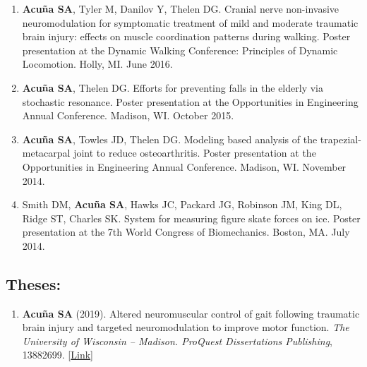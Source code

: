 \documentclass[letterpaper, 10pt]{article}
\begin{document}
\begin{enumerate}
    \item \textbf{Acuña SA}, Tyler M, Danilov Y, Thelen DG. Cranial nerve non-invasive neuromodulation for symptomatic treatment of mild and moderate traumatic brain injury: effects on muscle coordination patterns during walking. Poster presentation at the Dynamic Walking Conference: Principles of Dynamic Locomotion. Holly, MI. June 2016.
    \item \textbf{Acuña SA}, Thelen DG. Efforts for preventing falls in the elderly via stochastic resonance. Poster presentation at the Opportunities in Engineering Annual Conference. Madison, WI. October 2015.
    \item \textbf{Acuña SA}, Towles JD, Thelen DG. Modeling based analysis of the trapezial-metacarpal joint to reduce osteoarthritis. Poster presentation at the Opportunities in Engineering Annual Conference. Madison, WI. November 2014.
    \item Smith DM, \textbf{Acuña SA}, Hawks JC, Packard JG, Robinson JM, King DL, Ridge ST, Charles SK. System for measuring ﬁgure skate forces on ice. Poster presentation at the 7th World Congress of Biomechanics. Boston, MA. July 2014.
    
\end{enumerate}



\subsection{Theses:}
\begin{enumerate}
    \item \textbf{Acuña SA} (2019). Altered neuromuscular control of gait following traumatic brain injury and targeted neuromodulation to improve motor function. \textit{The University of Wisconsin -- Madison. ProQuest Dissertations Publishing}, 13882699. [\href{https://www.proquest.com/docview/2229834647}{Link}]
\end{enumerate}
\end{document}

